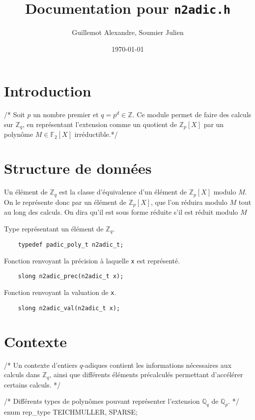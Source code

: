 \documentclass[11pt]{article}
\begin{document}
\title{Documentation pour \texttt{n2adic.h}}
\date{\today}
\author{Guillemot Alexandre, Soumier Julien}
\maketitle

\tableofcontents

\section{Introduction}
/* Soit $p$ un nombre premier et $q = p^d \in \mathbb{Z}$. Ce module permet de faire des calculs sur $\mathbb{Z}_{q}$, en représentant l'extension comme un quotient de $\mathbb{Z}_p[X]$ par un polynôme $M \in \mathbb{F}_2[X]$ irréductible.*/


\section{Structure de données}
Un élément de $\mathbb{Z}_q$ est la classe d'équivalence d'un élément de $\mathbb{Z}_p[X]$ modulo $M$. On le représente donc par un élément de $\mathbb{Z}_p[X]$, que l'on réduira modulo $M$ tout au long des calculs. On dira qu'il est sous forme réduite s'il est réduit modulo $M$

Type représentant un élément de $\mathbb{Z}_q$.
\begin{verbatim}
    typedef padic_poly_t n2adic_t;
\end{verbatim}

Fonction renvoyant la précision à laquelle \texttt{x} est représenté.
\begin{verbatim}
    slong n2adic_prec(n2adic_t x);
\end{verbatim}

Fonction renvoyant la valuation de \texttt{x}.
\begin{verbatim}
    slong n2adic_val(n2adic_t x);
\end{verbatim}


\section{Contexte}
/* Un contexte d'entiers $q$-adiques contient les informations nécessaires aux calculs dans $\mathbb{Z}_q$, ainsi que différents éléments précalculés permettant d'accélérer certains calculs. */

/* Différents types de polynômes pouvant représenter l'extension $\mathbb{Q}_q$ de $\mathbb{Q}_p$. */
enum rep_type {TEICHMULLER, SPARSE};
\end{document}

